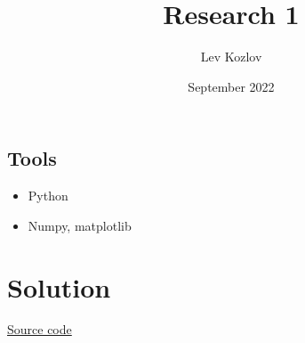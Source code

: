 \documentclass{article}
\title{Research 1}
\author{Lev Kozlov}
\date{September 2022}
\begin{document}
\maketitle

\subsection*{Tools}

\begin{itemize}
      \item Python
      \item Numpy, matplotlib
\end{itemize}

\section*{Solution}

\href{https://github.com/lvjonok/f22-theoretical-mechanics/blob/master/research1/main.ipynb}{Source code}
\end{document}
